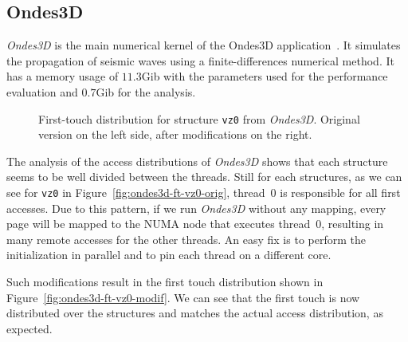 \subsection{Ondes3D}
\label{sec:exp-ondes3d}

\emph{Ondes3D} is the main numerical kernel of the Ondes3D
application~\cite{Dupros2008}. It simulates the propagation of seismic waves
using a finite-differences numerical method. It has a memory usage of
$11.3$Gib with the parameters used for the performance evaluation and $0.7$Gib
for the analysis.

\begin{figure}[htb]
    \centering

    \caption{First-touch distribution  for structure
        \texttt{vz0} from \emph{Ondes3D}. Original version on the left side,
    after modifications on the right.}
    \label{fig:ondes3d}
\end{figure}

The analysis of the access distributions of \emph{Ondes3D} shows that each
structure seems to be well divided between the threads.%
Still for each structures, as we can see for \texttt{vz0} in
Figure~\ref{fig:ondes3d-ft-vz0-orig},
thread~$0$ is responsible for all first accesses. Due to
this pattern, if we run \emph{Ondes3D} without any mapping, every page will be
mapped to the NUMA node that executes thread~$0$, resulting in many remote
accesses for the other threads. An easy fix is to perform the initialization
in parallel and to pin each thread on a different core.



Such modifications result in the first touch distribution shown in
Figure~\ref{fig:ondes3d-ft-vz0-modif}. We can see that the first touch is now distributed
over the structures and matches the actual access distribution, as expected.


